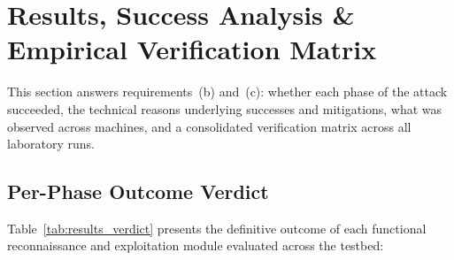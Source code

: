 \section{Results, Success Analysis \& Empirical Verification Matrix}\label{sec:results}

This section answers requirements~(b) and~(c): whether each phase of the attack succeeded, the
technical reasons underlying successes and mitigations, what was observed across machines, and a
consolidated verification matrix across all laboratory runs.

\subsection{Per-Phase Outcome Verdict}
Table~\ref{tab:results_verdict} presents the definitive outcome of each functional reconnaissance
and exploitation module evaluated across the testbed:

